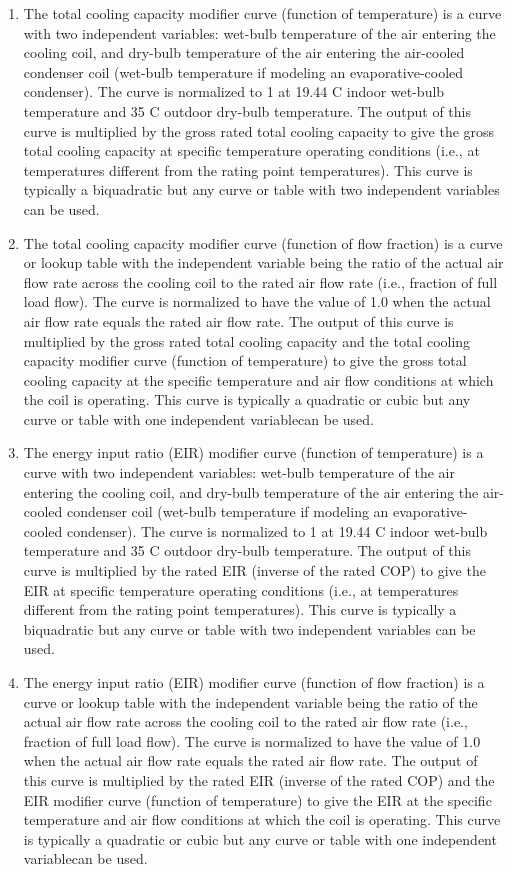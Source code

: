 \begin{enumerate}
\def\labelenumi{\arabic{enumi}.}
\item
  The total cooling capacity modifier curve (function of temperature) is a curve with two independent variables: wet-bulb temperature of the air entering the cooling coil, and dry-bulb temperature of the air entering the air-cooled condenser coil (wet-bulb temperature if modeling an evaporative-cooled condenser). The curve is normalized to 1 at 19.44 C indoor wet-bulb temperature and 35 C outdoor dry-bulb temperature. The output of this curve is multiplied by the gross rated total cooling capacity to give the gross total cooling capacity at specific temperature operating conditions (i.e., at temperatures different from the rating point temperatures). This curve is typically a biquadratic but any curve or table with two independent variables can be used.
\item
  The total cooling capacity modifier curve (function of flow fraction) is a curve or lookup table with the independent variable being the ratio of the actual air flow rate across the cooling coil to the rated air flow rate (i.e., fraction of full load flow). The curve is normalized to have the value of 1.0 when the actual air flow rate equals the rated air flow rate. The output of this curve is multiplied by the gross rated total cooling capacity and the total cooling capacity modifier curve (function of temperature) to give the gross total cooling capacity at the specific temperature and air flow conditions at which the coil is operating. This curve is typically a quadratic or cubic but any curve or table with one independent variablecan be used.
\item
  The energy input ratio (EIR) modifier curve (function of temperature) is a curve with two independent variables: wet-bulb temperature of the air entering the cooling coil, and dry-bulb temperature of the air entering the air-cooled condenser coil (wet-bulb temperature if modeling an evaporative-cooled condenser). The curve is normalized to 1 at 19.44 C indoor wet-bulb temperature and 35 C outdoor dry-bulb temperature. The output of this curve is multiplied by the rated EIR (inverse of the rated COP) to give the EIR at specific temperature operating conditions (i.e., at temperatures different from the rating point temperatures). This curve is typically a biquadratic but any curve or table with two independent variables can be used.
\item
  The energy input ratio (EIR) modifier curve (function of flow fraction) is a curve or lookup table with the independent variable being the ratio of the actual air flow rate across the cooling coil to the rated air flow rate (i.e., fraction of full load flow). The curve is normalized to have the value of 1.0 when the actual air flow rate equals the rated air flow rate. The output of this curve is multiplied by the rated EIR (inverse of the rated COP) and the EIR modifier curve (function of temperature) to give the EIR at the specific temperature and air flow conditions at which the coil is operating. This curve is typically a quadratic or cubic but any curve or table with one independent variablecan be used.

\end{enumerate}
